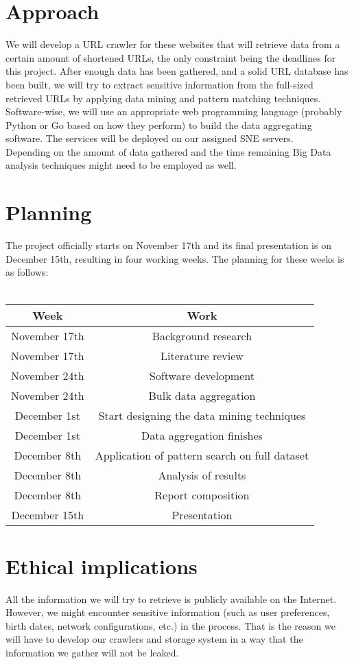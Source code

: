 \documentclass{article}
\begin{document}
\section{Approach}
We will develop a URL crawler for these websites that will retrieve data from a certain amount of shortened URLs, the only constraint being the deadlines for this project. After enough data has been gathered, and a solid URL database has been built, we will try to extract sensitive information from the full-sized retrieved URLs by applying data mining and pattern matching techniques. \\
Software-wise, we will use an appropriate web programming language (probably Python or Go based on how they perform) to build the data aggregating software. The services will be deployed on our assigned SNE servers.\\
Depending on the amount of data gathered and the time remaining Big Data analysis techniques might need to be employed as well. 

\section{Planning}
The project officially starts on November 17th and its final presentation is on December 15th, resulting in four working weeks. The planning for these weeks is as follows:
\\\\
\begin{table}[h]
  \label{tbl:example}
  \begin{tabular}{|c|c|}
    \hline
    Week  & Work \\
    \hline
    November 17th & Background research \\
    \hline
    November 17th & Literature review   \\
    \hline
    November 24th & Software development \\
    \hline
    November 24th & Bulk data aggregation \\
    \hline
    December 1st & Start designing the data mining techniques\\
    \hline
    December 1st & Data aggregation finishes\\
    \hline
    December 8th & Application of pattern search on full dataset \\
    \hline
    December 8th & Analysis of results \\
    \hline
    December 8th & Report composition  \\
    \hline
    December 15th & Presentation \\
    \hline
  \end{tabular}
\end{table}

\section{Ethical implications}
All the information we will try to retrieve is publicly available on the Internet. However, we might encounter sensitive information (such as user preferences, birth dates, network configurations, etc.) in the process. That is the reason we will have to develop our crawlers and storage system in a way that the information we gather will not be leaked.
\end{document}
